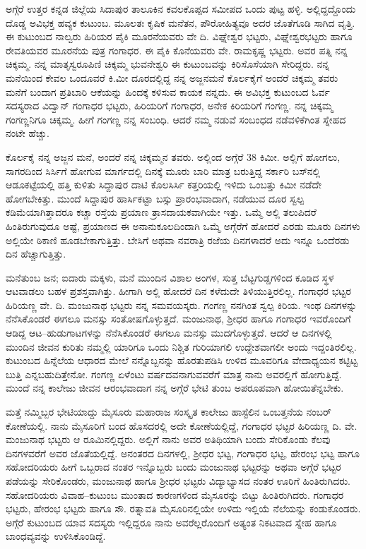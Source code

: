 {ಅಗ್ಗೆರೆ ಉತ್ತರ ಕನ್ನಡ ಜಿಲ್ಲೆಯ ಸಿದಾಪುರ ತಾಲೂಕಿನ ಕವಲಕೊಪ್ಪದ ಸಮೀಪದ ಒಂದು ಪುಟ್ಟ ಹಳ್ಳಿ.  ಅಲ್ಲಿದ್ದದ್ದೊಂದು ದೊಡ್ಡ ಅವಿಭಕ್ತ ಹವ್ಯಕ ಕುಟುಂಬ.  ಮೂಲತಃ ಕೃಷಿಕ ಮನೆತನ, ಪೌರೋಹಿತ್ಯವೂ ಅದರ ಜೊತೆಗೂಡಿ ಸಾಗಿದ ವೃತ್ತಿ.  ಈ ಕುಟುಂಬದ ನಾಲ್ವರು ಹಿರಿಯರ ಪೈಕಿ ಮೂರನೆಯವರು ವೇ ದಿ. ವಿಘ್ನೇಶ್ವರ ಭಟ್ಟರು,  ವಿಘ್ನೇಶ್ವರಭಟ್ಟರು ಹಾಗೂ ರೇವತಿಯವರ ಮೂರನೆಯ ಪುತ್ರ ಗಂಗಾಧರ.  ಈ ಪೈಕಿ ಕೊನೆಯವರು ವೇ. ರಾಮಕೃಷ್ಣ ಭಟ್ಟರು.  ಅವರ ಪತ್ನಿ ನನ್ನ ಚಿಕ್ಕಮ್ಮ.  ನನ್ನ ಮಾತೃಸ್ವರೂಪಿಣಿ ಚಿಕ್ಕಮ್ಮ ಭುವನೇಶ್ವರಿ ಈ ಕುಟುಂಬವನ್ನು ಕಿರಿಸೊಸೆಯಾಗಿ ಸೇರಿದ್ದರು.  ನನ್ನ ಮನೆಯಿಂದ ಕೇವಲ ಒಂದೂವರೆ ಕಿ.ಮೀ ದೂರದಲ್ಲಿದ್ದ ನನ್ನ ಅಜ್ಜನಮನೆ ಕೊರ್ಲಕೈಗೆ ಅಂದರೆ ಚಿಕ್ಕಮ್ಮ ತವರು ಮನೆಗೆ ಬಂದಾಗ ಪ್ರತಿಬಾರಿ ಆಕೆಯನ್ನು ಹಿಂದಕ್ಕೆ ಕಳಿಸುವ ಕಾಯಕ ನನ್ನದು.  ಈ ಅವಿಭಕ್ತ ಕುಟುಂಬದ ಓರ್ವ ಸದಸ್ಯರಾದ ವಿದ್ವಾನ್ ಗಂಗಾಧರ ಭಟ್ಟರು, ಹಿರಿಯರಿಗೆ ಗಂಗಾಧರ, ಅನೇಕ ಕಿರಿಯರಿಗೆ ಗಂಗಣ್ಣ.  ನನ್ನ ಚಿಕ್ಕಮ್ಮ ಗಂಗಣ್ಣನಿಗೂ ಚಿಕ್ಕಮ್ಮ.  ಹೀಗೆ ಗಂಗಣ್ಣ ನನ್ನ ಸಂಬಂಧಿ.  ಆದರೆ ನಮ್ಮ ನಡುವೆ ಸಂಬಂಧದ ನಡೆವಳಿಕೆಗಿಂತ ಸ್ನೇಹದ ನಂಟೇ ಹೆಚ್ಚು. 

ಕೊರ್ಲಕೈ ನನ್ನ ಅಜ್ಜನ ಮನೆ, ಅಂದರೆ ನನ್ನ ಚಿಕ್ಕಮ್ಮನ ತವರು.  ಅಲ್ಲಿಂದ ಅಗ್ಗೆರೆ 38 ಕಿಮೀ.  ಅಲ್ಲಿಗೆ ಹೋಗಲು, ಸಾಗರದಿಂದ ಸಿರ್ಸಿಗೆ ಹೋಗುವ ಮಾರ್ಗದಲ್ಲಿ ದಿನಕ್ಕೆ ಮೂರು ಬಾರಿ ಮಾತ್ರ ಬರುತ್ತಿದ್ದ ಸರ್ಕಾರಿ ಬಸ್‍ನಲ್ಲಿ ಆಡೂಕಟ್ಟೆಯಲ್ಲಿ ಹತ್ತಿ ಕುಳಿತು ಸಿದ್ದಾಪುರ ದಾಟಿ ಕೊಲಸಿರ್ಸಿ ಕತ್ತರಿಯಲ್ಲಿ ಇಳಿದು ಒಂಬತ್ತು ಕಿಮೀ ನಡೆದೇ ಹೋಗಬೇಕಿತ್ತು.  ಮುಂದೆ ಸಿದ್ದಾಪುರ ಹಾರ್ಸಿಕಟ್ಟಾ ಬಸ್ಸು ಪ್ರಾರಂಭವಾದಾಗ, ನಡೆಯುವ ದೂರ ಸ್ವಲ್ಪ ಕಡಿಮೆಯಾಗಿತ್ತಾದರೂ ಕಚ್ಚಾ ರಸ್ತೆಯ ಪ್ರಯಾಣ ತ್ರಾಸದಾಯಕವಾಗಿಯೇ ಇತ್ತು.  ಒಮ್ಮೆ ಅಲ್ಲಿ ತಲುಪಿದರೆ ಹಿಂತಿರುಗುವುದೂ ಅಷ್ಟೆ, ಪ್ರಯಾಣದ ಈ ಅನಾನುಕೂಲದಿಂದಾಗಿ ಒಮ್ಮೆ ಅಗ್ಗೆರೆಗೆ ಹೋದರೆ ಎರಡು ಮೂರು ದಿನಗಳು ಅಲ್ಲಿಯೇ ಠಿಕಾಣಿ ಹೂಡಬೇಕಾಗುತ್ತಿತ್ತು.  ಬೇಸಿಗೆ ಅಥವಾ ನವರಾತ್ರಿ ರಜೆಯ ದಿನಗಳಾದರೆ ಅದು ಇನ್ನೂ ಒಂದೆರಡು ದಿನ ಹೆಚ್ಚಾಗುತ್ತಿತ್ತು.  

ಮನೆತುಂಬ ಜನ; ಐದಾರು ಮಕ್ಕಳು, ಮನೆ ಮುಂದಿನ ವಿಶಾಲ ಅಂಗಳ, ಸುತ್ತ ಬೆಟ್ಟಗುಡ್ಡಗಳಿಂದ ಕೂಡಿದ ಸ್ಥಳ ಆಟವಾಡಲು ಬಹಳ ಪ್ರಶಸ್ತವಾಗಿತ್ತು.  ಹೀಗಾಗಿ ಅಲ್ಲಿ ಹೋದರೆ ದಿನ ಕಳೆದುದೇ ತಿಳಿಯುತ್ತಿರಲಿಲ್ಲ.  ಗಂಗಾಧರ ಭಟ್ಟರ ಹಿರಿಯಣ್ಣ ವೇ. ದಿ. ಮಂಜುನಾಥ ಭಟ್ಟರು ನನ್ನ ಸಮವಯಸ್ಕರು.  ಗಂಗಣ್ಣ ನನಗಿಂತ ಸ್ವಲ್ಪ ಕಿರಿಯ.  ಇಂಥ ದಿನಗಳನ್ನು ನೆನೆಸಿಕೊಂಡರೆ ಈಗಲೂ ಮನಸ್ಸು ಸಂತೋಷಗೊಳ್ಳುತ್ತದೆ.  ಮಂಜುನಾಥ, ಶ್ರೀಧರ ಹಾಗೂ ಗಂಗಾಧರ ಇವರೊಂದಿಗೆ ಆಡಿದ್ದ ಆಟ–ಹುಡುಗಾಟಗಳನ್ನು ನೆನೆಸಿಕೊಂಡರೆ ಈಗಲೂ ಮನಸ್ಸು ಮುದಗೊಳ್ಳುತ್ತದೆ.  ಆದರೆ ಆ ದಿನಗಳಲ್ಲಿ ಮುಂದಿನ ಜೀವನ ಕುರಿತು ನಮ್ಮಲ್ಲಿ ಯಾರಿಗೂ ಒಂದು ನಿಶ್ಚಿತ ಗುರಿಯಾಗಲಿ ಉದ್ದೇಶವಾಗಲೀ ಅಂದು ಇದ್ದಂತಿರಲಿಲ್ಲ.  ಕುಟುಂಬದ ಹಿನ್ನೆಲೆಯ ಆಧಾರದ ಮೇಲೆ ನನ್ನೊಬ್ಬನನ್ನು ಹೊರತುಪಡಿಸಿ ಉಳಿದ ಮೂವರಿಗೂ ವೇದಾಧ್ಯಯನ ಕಟ್ಟಿಟ್ಟ ಬುತ್ತಿ ಎನ್ನಬಹುದಿತ್ತೇನೋ.  ಗಂಗಣ್ಣ ಏಳೆಂಟು ವರ್ಷದವನಾಗುವವರೆಗೆ ಮಾತ್ರ ನಾನು ಅವರಲ್ಲಿಗೆ ಹೋಗುತ್ತಿದ್ದೆ.  ಮುಂದೆ ನನ್ನ ಕಾಲೇಜು ಜೀವನ ಆರಂಭವಾದಾಗ ನನ್ನ ಅಗ್ಗೆರೆ ಭೇಟಿ ತುಂಬ ಅಪರೂಪವಾಗಿ ಹೋಯಿತೆನ್ನಬೇಕು. 

ಮತ್ತೆ ನಮ್ಮಿಬ್ಬರ ಭೇಟಿಯಾದ್ದು ಮೈಸೂರು ಮಹಾರಾಜ ಸಂಸ್ಕೃತ ಕಾಲೇಜು ಹಾಸ್ಟೆಲಿನ ಒಂಬತ್ತನೆಯ ನಂಬರ್ ಕೋಣೆಯಲ್ಲಿ.  ನಾನು ಮೈಸೂರಿಗೆ ಬಂದ ಹೊಸದರಲ್ಲಿ ಅದೇ ಕೋಣೆಯಲ್ಲಿದ್ದೆ, ಗಂಗಾಧರ ಭಟ್ಟರ ಹಿರಿಯಣ್ಣ ದಿ. ವೇ. ಮಂಜುನಾಥ ಭಟ್ಟರು ಆ ರೂಮಿನಲ್ಲಿದ್ದರು.  ಅಲ್ಲಿಗೆ ನಾನು ಅವರ ಅತಿಥಿಯಾಗಿ ಬಂದು ಸೇರಿಕೊಂಡು ಕೆಲವು ದಿನಗಳವರೆಗೆ ಅವರ ಜೊತೆಯಲ್ಲಿದ್ದೆ.  ಅನಂತರದ ದಿನಗಳಲ್ಲಿ, ಶ್ರೀಧರ ಭಟ್ಟ, ಗಂಗಾಧರ ಭಟ್ಟ, ಹೇರಂಭ ಭಟ್ಟ ಹಾಗೂ ಸಹೋದರಿಯರು ಹೀಗೆ ಒಬ್ಬರಾದ ನಂತರ ಇನ್ನೊಬ್ಬರು ಬಂದು ಮಂಜುನಾಥ ಭಟ್ಟರನ್ನು ಅಥವಾ ಅಗ್ಗೆರೆ ಭಟ್ಟರ ಪಡೆಯನ್ನು ಸೇರಿಕೊಂಡರು,  ಮಂಜುನಾಥ ಹಾಗೂ ಶ್ರೀಧರ ಭಟ್ಟರು ವಿದ್ಯಾಭ್ಯಾಸದ ನಂತರ ಊರಿಗೆ ಹಿಂತಿರುಗಿದರು.  ಸಹೋದರಿಯರು ವಿವಾಹ–ಕುಟುಂಬ ಮುಂತಾದ ಕಾರಣಗಳಿಂದ ಮೈಸೂರನ್ನು ಬಿಟ್ಟು ಹಿಂತಿರುಗಿದರು.  ಗಂಗಾಧರ ಭಟ್ಟರು, ಹೇರಂಭ ಭಟ್ಟರು ಹಾಗೂ ಸೌ. ರತ್ನಾವತಿ ಮೈಸೂರಿನಲ್ಲಿಯೇ ಉಳಿದು ಇಲ್ಲಿಯೆ ನೆಲೆಯನ್ನು ಕಂಡುಕೊಂಡರು.  ಅಗ್ಗೆರೆ ಕುಟುಂಬದ ಯಾವ ಸದಸ್ಯರು ಇಲ್ಲಿದ್ದರೂ ನಾನು ಅವರೆಲ್ಲರೊಂದಿಗೆ ಅತ್ಯಂತ ನಿಕಟವಾದ ಸ್ನೇಹ ಹಾಗೂ ಬಾಂಧವ್ಯವನ್ನು ಉಳಿಸಿಕೊಂಡಿದ್ದೆ.  

}
